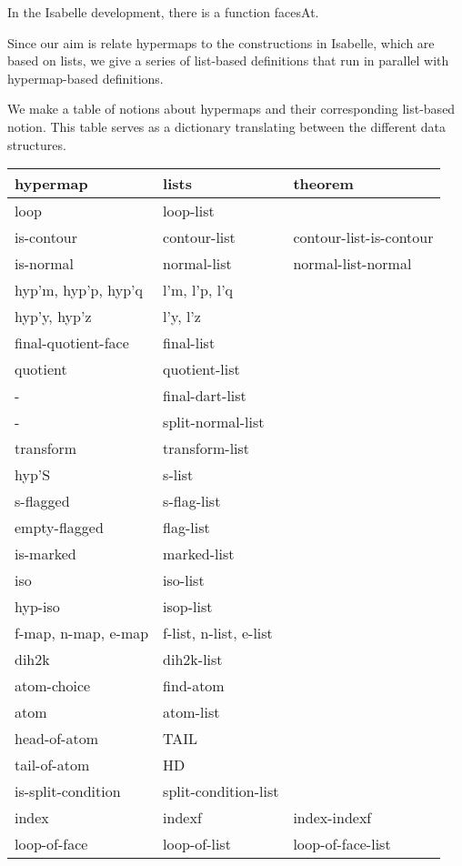 In the Isabelle development, there is a function facesAt.



Since our aim is relate hypermaps to the constructions in Isabelle, which
are based on lists, we give a series of list-based definitions that run
in parallel with hypermap-based definitions.

We make a table of notions about hypermaps and their corresponding list-based notion.
This table serves as a dictionary translating between the different data structures.

\bigskip
\begin{tabular}{l l l}
\hline
{\bf hypermap} & {\bf lists} & {\bf theorem}\\ \hline
loop & loop-list \\
is-contour & contour-list & contour-list-is-contour\\
is-normal & normal-list & normal-list-normal\\
hyp'm, hyp'p, hyp'q & l'm, l'p, l'q \\
hyp'y, hyp'z & l'y, l'z \\
final-quotient-face   & final-list \\
quotient & quotient-list \\
- & final-dart-list \\
- & split-normal-list \\
transform & transform-list \\
hyp'S & s-list \\
s-flagged & s-flag-list \\
empty-flagged & flag-list \\
is-marked & marked-list \\
iso & iso-list \\
hyp-iso & isop-list \\
f-map, n-map, e-map & f-list, n-list, e-list\\
dih2k & dih2k-list\\
atom-choice & find-atom \\
atom & atom-list \\
head-of-atom & TAIL \\
tail-of-atom & HD \\
is-split-condition & split-condition-list \\
index & indexf & index-indexf \\
loop-of-face & loop-of-list & loop-of-face-list \\
\hline
\end{tabular}

